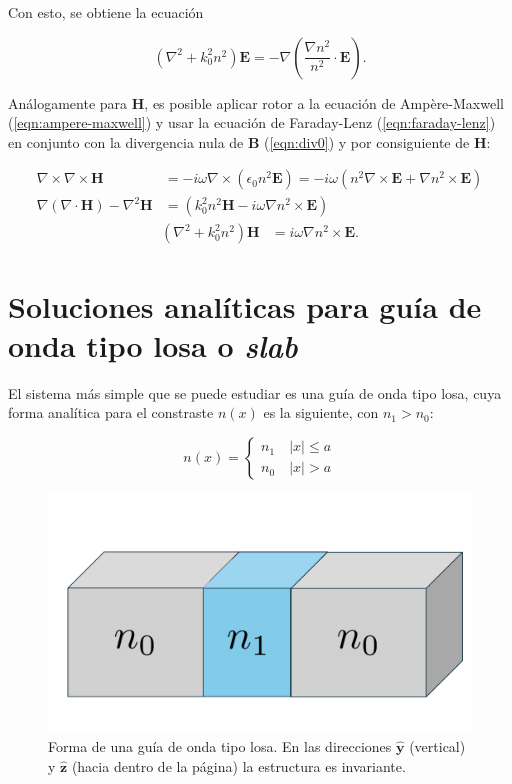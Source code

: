 Con esto, se obtiene la ecuación 

\begin{equation}
	(\nabla^2  + k_0^2n^2)\textbf{E} = -\nabla\left( \frac{\nabla n^2}{n^2} \cdot \textbf{E}  \right). \label{eqn:helmholz}
\end{equation}

Análogamente para \textbf{H}, es posible aplicar rotor a la ecuación de Ampère-Maxwell (\ref{eqn:ampere-maxwell}) y usar la ecuación de Faraday-Lenz (\ref{eqn:faraday-lenz}) en conjunto con la divergencia nula de \textbf{B} (\ref{eqn:div0}) y por consiguiente de \textbf{H}:

\begin{align}
	\nabla\times\nabla\times \textbf{H} &= -i \omega \nabla\times\left(\epsilon_0 n^2 \textbf{E}\right) = -i\omega \left(n^2 \nabla\times \textbf{E} + \nabla n^2 \times \textbf{E}\right)
	\nonumber
	\\
	\nabla\left( {\nabla\cdot \textbf{H}} \right)- \nabla^2 \textbf{H}
	&= 
	 \left( k_0^2 n^2\textbf{H} - i\omega  \nabla n^2 \times \textbf{E}  \right)
	 	\nonumber
\end{align}
\begin{align}
	 \left(\nabla^2  + k_0^2 n^2 \right) \textbf{H} &= i\omega  \nabla n^2 \times \textbf{E}.
	 \label{eqn:helmholzH}
	\end{align}

\section{Soluciones analíticas para guía de onda tipo losa o \textit{slab}}

El sistema más simple que se puede estudiar es una guía de onda tipo losa, cuya forma analítica para el constraste $n(x)$ es la siguiente, con $n_1 > n_0$:

\begin{equation*}
	n(x) = \left\{\begin{matrix}
	n_1 \quad |x| \le a
	\\
	n_0 \quad |x| > a
 	\end{matrix}\right.
\end{equation*}

\begin{figure}[H]
	\centering
	\includegraphics[width=0.6\linewidth]{media/slab.pdf}
	\caption[Forma de una guía de onda tipo losa.]{Forma de una guía de onda tipo losa. En las direcciones $\mathbf{\hat{y}}$ (vertical) y $\mathbf{\hat{z}}$ (hacia dentro de la página) la estructura es invariante.}
\end{figure}
